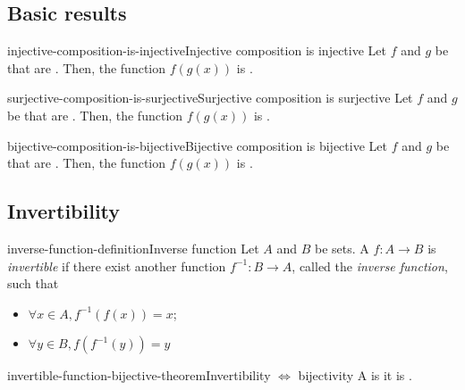 \documentclass[preview]{standalone}
\begin{document}
\subsection{Basic results}

\begin{snippetproposition}{injective-composition-is-injective}{Injective composition is injective}
    Let \(f\) and \(g\) be \function[functions] that are \injective.
    Then, the function \(f(g(x))\) is \injective.
\end{snippetproposition}

\begin{snippetproposition}{surjective-composition-is-surjective}{Surjective composition is surjective}
    Let \(f\) and \(g\) be \function[functions] that are \surjective.
    Then, the function \(f(g(x))\) is \surjective.
\end{snippetproposition}

\begin{snippetproposition}{bijective-composition-is-bijective}{Bijective composition is bijective}
    Let \(f\) and \(g\) be \function[functions] that are \bijective.
    Then, the function \(f(g(x))\) is \bijective.
\end{snippetproposition}

\subsection{Invertibility}

\begin{snippetdefinition}{inverse-function-definition}{Inverse function}
    Let \(A\) and \(B\) be sets. A \function \(f\colon A \to B\) is \textit{invertible}
    if there exist another function \(f^{-1}\colon B \to A\), called the \textit{inverse function},
    such that
    \begin{itemize}
        \item \(\forall x \in A, f^{-1}(f(x)) = x\);
        \item \(\forall y \in B, f(f^{-1}(y)) = y\)
    \end{itemize}
\end{snippetdefinition}

\begin{snippettheorem}{invertible-function-bijective-theorem}{Invertibility \(\iff\) bijectivity}
    A \function is 
    \ifandonlyif it is .
\end{snippettheorem}
\end{document}
